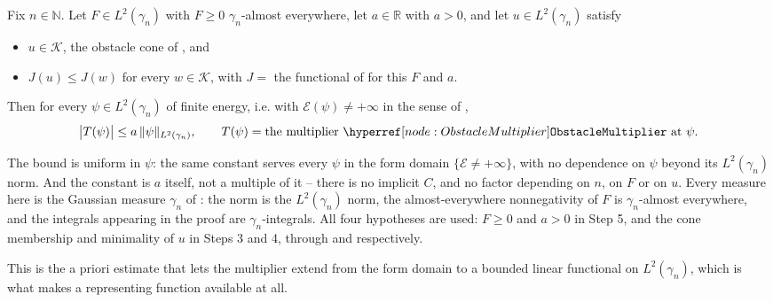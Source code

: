 \begin{lemma}
Fix $n \in \mathbb{N}$.  Let $F \in L^2(\gamma_n)$ with $F \geq 0$
$\gamma_n$-almost everywhere, let $a \in \mathbb{R}$ with $a > 0$, and let
$u \in L^2(\gamma_n)$ satisfy
\begin{itemize}
  \item $u \in \mathcal{K}$, the obstacle cone of , and
  \item $J(u) \leq J(w)$ for every $w \in \mathcal{K}$, with
    $J = $ the functional of  for this $F$ and $a$.
\end{itemize}
Then for every $\psi \in L^2(\gamma_n)$ of finite energy, i.e. with
$\mathcal{E}(\psi) \neq +\infty$ in the sense of ,
\[
  \bigl| T(\psi) \bigr| \leq a\, \|\psi\|_{L^2(\gamma_n)} ,
  \qquad
  T(\psi) = \text{the multiplier } \noderef{ObstacleMultiplier} \text{ at } \psi .
\]

The bound is uniform in $\psi$: the same constant serves every $\psi$ in the form
domain $\{\mathcal{E} \neq +\infty\}$, with no dependence on $\psi$ beyond its
$L^2(\gamma_n)$ norm.  And the constant is $a$ itself, not a multiple of it --
there is no implicit $C$, and no factor depending on $n$, on $F$ or on $u$.  Every
measure here is the Gaussian measure $\gamma_n$ of : the
norm is the $L^2(\gamma_n)$ norm, the almost-everywhere nonnegativity of $F$ is
$\gamma_n$-almost everywhere, and the integrals appearing in the proof are
$\gamma_n$-integrals.  All four hypotheses are used: $F \geq 0$ and $a > 0$ in
Step 5, and the cone membership and minimality of $u$ in Steps 3 and 4, through
 and  respectively.

This is the a priori estimate that lets the multiplier extend from the form domain
to a bounded linear functional on $L^2(\gamma_n)$, which is what makes a
representing function available at all.
\end{lemma}
